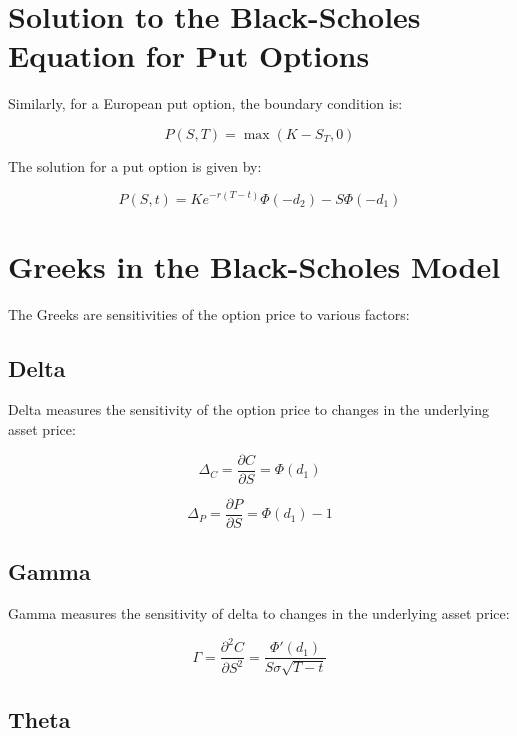 \documentclass[../Main.tex]{subfiles}
\begin{document}
\section{Solution to the Black-Scholes Equation for Put Options}

Similarly, for a European put option, the boundary condition is:

\begin{equation}
    P(S, T) = \max(K - S_T, 0)
\end{equation}

The solution for a put option is given by:

\begin{equation}
    P(S, t) = K e^{-r(T-t)} \Phi(-d_2) - S \Phi(-d_1)
\end{equation}

\section{Greeks in the Black-Scholes Model}

The Greeks are sensitivities of the option price to various factors:

\subsection{Delta}

Delta measures the sensitivity of the option price to changes in the underlying asset price:

\begin{equation}
    \Delta_C = \frac{\partial C}{\partial S} = \Phi(d_1)
\end{equation}

\begin{equation}
    \Delta_P = \frac{\partial P}{\partial S} = \Phi(d_1) - 1
\end{equation}

\subsection{Gamma}

Gamma measures the sensitivity of delta to changes in the underlying asset price:

\begin{equation}
    \Gamma = \frac{\partial^2 C}{\partial S^2} = \frac{\Phi'(d_1)}{S \sigma \sqrt{T - t}}
\end{equation}

\subsection{Theta}
\end{document}
